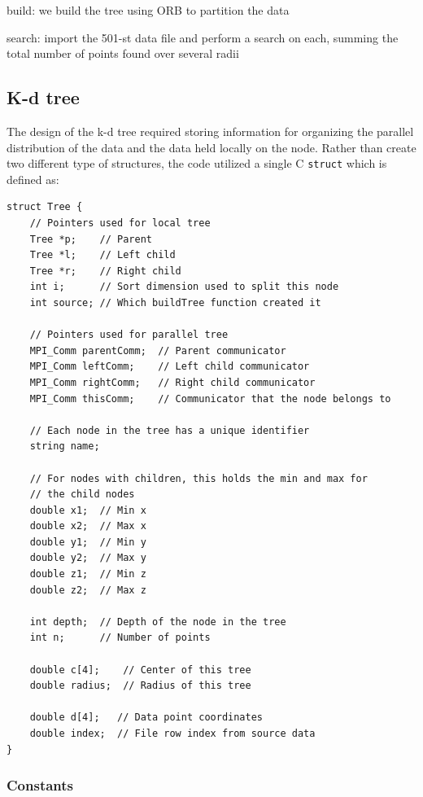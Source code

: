 \documentclass{article}
\begin{document}
build: we build the tree using ORB to partition the data


search: import the 501-st data file and perform a search on each, summing the total number of points found over several radii


%
%

\subsection{K-d tree}
%
%

The design of the k-d tree required storing information for organizing the parallel distribution of the data and the data held locally on the node. Rather than create two different type of structures, the code utilized a single C \texttt{struct} which is defined as:

\lstset{language=C++, keepspaces=true}
\begin{lstlisting}
struct Tree {
    // Pointers used for local tree
	Tree *p;    // Parent
	Tree *l;    // Left child
	Tree *r;    // Right child
	int i;      // Sort dimension used to split this node
	int source; // Which buildTree function created it

    // Pointers used for parallel tree
	MPI_Comm parentComm;  // Parent communicator
	MPI_Comm leftComm;    // Left child communicator
	MPI_Comm rightComm;   // Right child communicator
	MPI_Comm thisComm;    // Communicator that the node belongs to

    // Each node in the tree has a unique identifier
	string name;

    // For nodes with children, this holds the min and max for
    // the child nodes
	double x1;  // Min x
	double x2;  // Max x
	double y1;  // Min y
	double y2;  // Max y
	double z1;  // Min z
	double z2;  // Max z

	int depth;  // Depth of the node in the tree
	int n;      // Number of points

	double c[4];    // Center of this tree
	double radius;  // Radius of this tree

	double d[4];   // Data point coordinates
	double index;  // File row index from source data
}
\end{lstlisting}

%
%

\subsubsection{Constants}\label{sec:constants}
\end{document}
